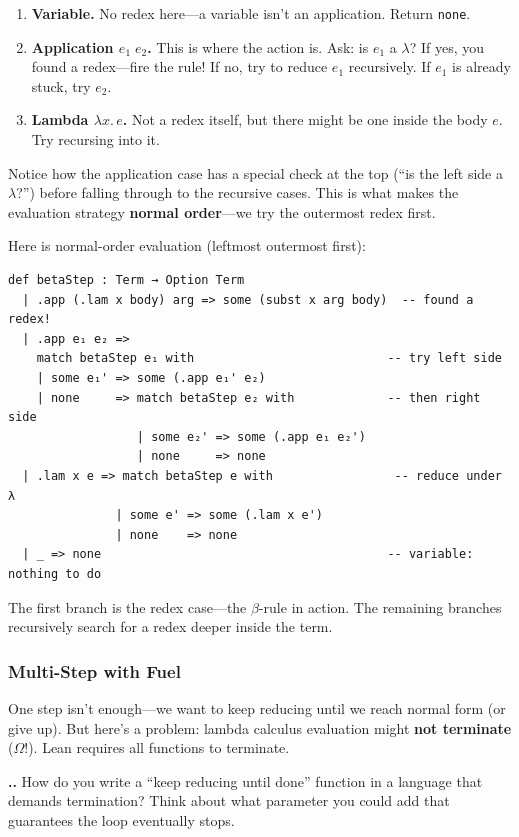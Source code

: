\documentclass[11pt,a4paper]{article}
\newcounter{exercise}[section]
\renewcommand{\theexercise}{\thesection.\arabic{exercise}}
\theoremstyle{definition}
\newcommand{\lam}{\lambda}
\begin{document}
\begin{enumerate}[leftmargin=2em]
\item \textbf{Variable.} No redex here---a variable isn't an application. Return
  \texttt{none}.
\item \textbf{Application $e_1\;e_2$.} This is where the action is. Ask: is
  $e_1$ a $\lam$? If yes, you found a redex---fire the rule! If no, try to
  reduce $e_1$ recursively. If $e_1$ is already stuck, try $e_2$.
\item \textbf{Lambda $\lam x.\, e$.} Not a redex itself, but there might be one
  inside the body $e$. Try recursing into it.
\end{enumerate}

Notice how the application case has a special check at the top (``is the left
side a $\lam$?'') before falling through to the recursive cases. This is what
makes the evaluation strategy \textbf{normal order}---we try the outermost
redex first.

Here is normal-order evaluation (leftmost outermost first):

\begin{verbatim}
def betaStep : Term → Option Term
  | .app (.lam x body) arg => some (subst x arg body)  -- found a redex!
  | .app e₁ e₂ =>
    match betaStep e₁ with                           -- try left side
    | some e₁' => some (.app e₁' e₂)
    | none     => match betaStep e₂ with             -- then right side
                  | some e₂' => some (.app e₁ e₂')
                  | none     => none
  | .lam x e => match betaStep e with                 -- reduce under λ
               | some e' => some (.lam x e')
               | none    => none
  | _ => none                                        -- variable: nothing to do
\end{verbatim}

The first branch is the redex case---the $\beta$-rule in action. The remaining
branches recursively search for a redex deeper inside the term.

\subsubsection{Multi-Step with Fuel}

One step isn't enough---we want to keep reducing until we reach normal form (or
give up). But here's a problem: lambda calculus evaluation might
\textbf{not terminate} ($\Omega$!). Lean requires all functions to terminate.

\begin{exercisebox}
\textbf{\theexercise.}\; How do you write a ``keep reducing until done'' function in a language that demands termination? Think about what parameter you could add that guarantees the loop eventually stops.
\end{exercisebox}
\end{document}
